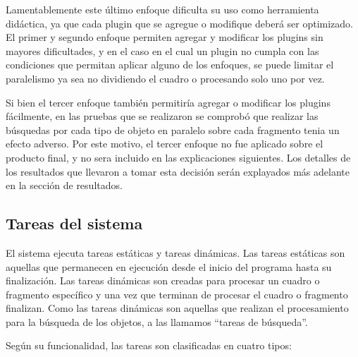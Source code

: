 Lamentablemente este último enfoque dificulta su uso como herramienta didáctica,
ya que cada plugin que se agregue o modifique deberá ser optimizado. El primer y
segundo enfoque permiten agregar y modificar los plugins sin mayores
dificultades, y en el caso en el cual un plugin no cumpla con las condiciones
que permitan aplicar alguno de los enfoques, se puede limitar el paralelismo ya
sea no dividiendo el cuadro o procesando solo uno por vez.

Si bien el tercer enfoque también permitiría agregar o modificar los plugins
fácilmente, en las pruebas que se realizaron se comprobó que realizar las
búsquedas por cada tipo de objeto en paralelo sobre cada fragmento tenia un
efecto adverso. Por este motivo, el tercer enfoque no fue aplicado sobre el
producto final, y no sera incluido en las explicaciones siguientes. Los detalles
de los resultados que llevaron a tomar esta decisión serán explayados más
adelante en la sección de resultados.

\subsection{Tareas del sistema}

El sistema ejecuta tareas estáticas y tareas dinámicas. Las tareas estáticas son
aquellas que permanecen en ejecución desde el inicio del programa hasta su
finalización. Las tareas dinámicas son creadas para procesar un cuadro o
fragmento específico y una vez que terminan de procesar el cuadro o fragmento
finalizan. Como las tareas dinámicas son aquellas que realizan el procesamiento
para la búsqueda de los objetos, a las llamamos ``tareas de búsqueda''.

Según su funcionalidad, las tareas son clasificadas en cuatro tipos:

